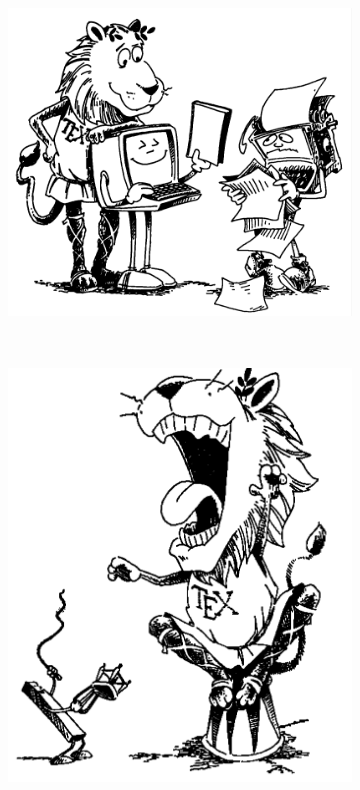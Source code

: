 \documentclass{myreport}
\begin{document}
\begin{figure}[htbp]
	\centering
	\begin{subfigure}[b]{.4\textwidth}
		\centering
		\includegraphics[width = \textwidth]{Chapter2}
		\label{subfig:1a} 
	\end{subfigure}
	\quad \\
	\begin{subfigure}[b]{.2\textwidth}
		\centering
		\includegraphics[width = \textwidth]{Chapter3}

\end{subfigure}
\end{figure}
\end{document}
